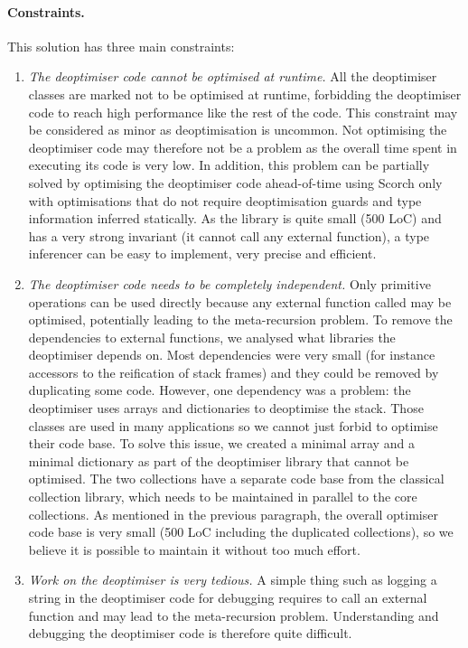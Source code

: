 \documentclass[a4paper,12pt,twoside]{../includes/ThesisStyle}
\begin{document}
\paragraph{Constraints.} This solution has three main constraints:
\begin{enumerate}
	\item \emph{The deoptimiser code cannot be optimised at runtime.} All the deoptimiser classes are marked not to be optimised at runtime, forbidding the deoptimiser code to reach high performance like the rest of the code. This constraint may be considered as minor as deoptimisation is uncommon. Not optimising the deoptimiser code may therefore not be a problem as the overall time spent in executing its code is very low. In addition, this problem can be partially solved by optimising the deoptimiser code ahead-of-time using Scorch only with optimisations that do not require deoptimisation guards and type information inferred statically. As the library is quite small (500 LoC) and has a very strong invariant (it cannot call any external function), a type inferencer can be easy to implement, very precise and efficient.
	\item \emph{The deoptimiser code needs to be completely independent.} Only primitive operations can be used directly because any external function called may be optimised, potentially leading to the meta-recursion problem. To remove the dependencies to external functions, we analysed what libraries the deoptimiser depends on. Most dependencies were very small (for instance accessors to the reification of stack frames) and they could be removed by duplicating some code. However, one dependency was a problem: the deoptimiser uses arrays and dictionaries to deoptimise the stack. Those classes are used in many applications so we cannot just forbid to optimise their code base. To solve this issue, we created a minimal array and a minimal dictionary as part of the deoptimiser library that cannot be optimised. The two collections have a separate code base from the classical collection library, which needs to be maintained in parallel to the core collections. As mentioned in the previous paragraph, the overall optimiser code base is very small (500 LoC including the duplicated collections), so we believe it is possible to maintain it without too much effort.
	\item \emph{Work on the deoptimiser is very tedious.} A simple thing such as logging a string in the deoptimiser code for debugging requires to call an external function and may lead to the meta-recursion problem. Understanding and debugging the deoptimiser code is therefore quite difficult.
\end{enumerate}
\end{document}
